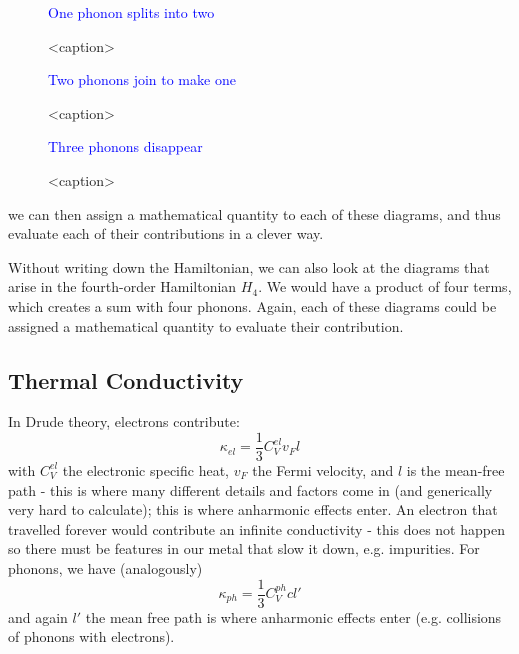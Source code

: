 \begin{figure}[htbp]
    \centering
    \textcolor{blue}{One phonon splits into two}
    \caption{<caption>}
    \label{<label>}
\end{figure}

\begin{figure}[htbp]
    \centering
    \textcolor{blue}{Two phonons join to make one}
    \caption{<caption>}
    \label{<label>}
\end{figure}

\begin{figure}[htbp]
    \centering
    \textcolor{blue}{Three phonons disappear}
    \caption{<caption>}
    \label{<label>}
\end{figure}

we can then assign a mathematical quantity to each of these diagrams, and thus evaluate each of their contributions in a clever way.

Without writing down the Hamiltonian, we can also look at the diagrams that arise in the fourth-order Hamiltonian $H_4$. We would have a product of four terms, which creates a sum with four phonons. Again, each of these diagrams could be assigned a mathematical quantity to evaluate their contribution.

\subsection{Thermal Conductivity}
In Drude theory, electrons contribute:
\begin{equation}
    \kappa_{el} = \frac{1}{3}C^{el}_V v_F l
\end{equation}
with $C^{el}_V$ the electronic specific heat, $v_F$ the Fermi velocity, and $l$ is the mean-free path - this is where many different details and factors come in (and generically very hard to calculate); this is where anharmonic effects enter. An electron that travelled forever would contribute an infinite conductivity - this does not happen so there must be features in our metal that slow it down, e.g. impurities. For phonons, we have (analogously)
\begin{equation}
    \kappa_{ph} = \frac{1}{3}C^{ph}_V c l'
\end{equation}
and again $l'$ the mean free path is where anharmonic effects enter (e.g. collisions of phonons with electrons).